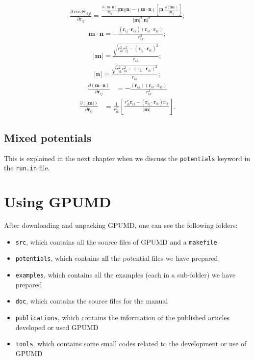 \documentclass[12pt,a4paper]{report}
\newcommand{\vect}[1]{\boldsymbol{#1}}
\begin{document}
\begin{align} 
\frac{\partial \cos\Theta_{ikjl}}{\partial \vect{r}_{ij}}
= \frac{\frac{\partial (\vect{m}\cdot\vect{n})}{\partial \vect{r}_{ij}} |\vect{m}|| \vect{n}|
-  (\vect{m}\cdot\vect{n}) 
\left[ |\vect{n}| \frac{\partial (| \vect{m}|) } { \partial \vect{r}_{ij}}  \right] }
{|\vect{m}|^2 |\vect{n}|^2};
\end{align}
\begin{align} 
\vect{m}\cdot\vect{n} = -  \frac{(\vect{r}_{ij} \cdot \vect{r}_{ik}) (\vect{r}_{ik} \cdot \vect{r}_{kl}) }{r_{ik}^2};
\end{align}
\begin{align} 
|\vect{m}|
 = \frac{\sqrt{ r_{ik}^2r_{ij}^2-(\vect{r}_{ij} \cdot \vect{r}_{ik})^2} } {r_{ik}};
\end{align}
\begin{align} 
| \vect{n}|
 = \frac{  \sqrt{ r_{ik}^2r_{kl}^2-(\vect{r}_{kl} \cdot \vect{r}_{ik})^2} } {r_{ik}};
\end{align}
\begin{align} 
\frac{\partial (\vect{m}\cdot\vect{n})}{\partial \vect{r}_{ij}} 
& =  -  \frac{( \vect{r}_{ik}) (\vect{r}_{ik} \cdot \vect{r}_{kl}) }{r_{ik}^2}
\end{align}
\begin{align} 
\frac{\partial (|\vect{m}|) }{ \partial \vect{r}_{ij}} 
& = 
\frac{1}{r_{ik}^2}
\left[
    \frac{r_{ik}^2 \vect{r}_{ij} - (\vect{r}_{ij} \cdot \vect{r}_{ik}) \vect{r}_{ik} }{|\vect{m}|} 
\right] .
\end{align}

\section{Mixed potentials}

This is explained in the next chapter when we discuss the \verb"potentials" keyword in the \verb"run.in" file.

\chapter{Using GPUMD \label{chapter:usage}}

After downloading and unpacking GPUMD, one can see the following folders:
\begin{itemize}
\item \verb"src", which contains all the source files of GPUMD and a \verb"makefile"
\item \verb"potentials", which contains all the potential files we have prepared
\item \verb"examples", which contains all the examples (each in a sub-folder) we have prepared
\item \verb"doc", which contains the source files for the manual
\item \verb"publications", which contains the information of the published articles developed or used GPUMD
\item \verb"tools", which contains some small codes related to the development or use of GPUMD
\end{itemize}
\end{document}
